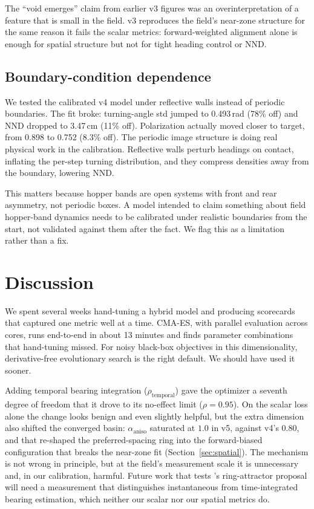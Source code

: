 \documentclass[11pt]{article}
\begin{document}
The ``void emerges'' claim from earlier v3 figures was an
overinterpretation of a feature that is small in the field. v3
reproduces the field's near-zone structure for the same reason it
fails the scalar metrics: forward-weighted alignment alone is enough
for spatial structure but not for tight heading control or NND.

\subsection{Boundary-condition dependence}

We tested the calibrated v4 model under reflective walls instead of
periodic boundaries. The fit broke: turning-angle std jumped to
0.493\,rad (78\% off) and NND dropped to 3.47\,cm (11\% off).
Polarization actually moved closer to target, from 0.898 to 0.752
(8.3\% off). The periodic image structure is doing real physical work
in the calibration. Reflective walls perturb headings on contact,
inflating the per-step turning distribution, and they compress
densities away from the boundary, lowering NND.

This matters because hopper bands are open systems with front and rear
asymmetry, not periodic boxes. A model intended to claim something
about field hopper-band dynamics needs to be calibrated under realistic
boundaries from the start, not validated against them after the fact.
We flag this as a limitation rather than a fix.

\section{Discussion}

We spent several weeks hand-tuning a hybrid model and producing scorecards
that captured one metric well at a time. CMA-ES, with parallel evaluation
across cores, runs end-to-end in about 13 minutes and finds parameter
combinations that hand-tuning missed. For noisy black-box objectives in
this dimensionality, derivative-free evolutionary search is the right
default. We should have used it sooner.

Adding temporal bearing integration ($\rho_\text{temporal}$) gave the
optimizer a seventh degree of freedom that it drove to its no-effect
limit ($\rho = 0.95$). On the scalar loss alone the change looks
benign and even slightly helpful, but the extra dimension also
shifted the converged basin: $\alpha_\text{aniso}$ saturated at $1.0$
in v5, against v4's $0.80$, and that re-shaped the preferred-spacing
ring into the forward-biased configuration that breaks the near-zone
fit (Section~\ref{sec:spatial}). The mechanism is not wrong in
principle, but at the field's measurement scale it is unnecessary and,
in our calibration, harmful. Future work that tests
\citet{sayin2025}'s ring-attractor proposal will need a measurement
that distinguishes instantaneous from time-integrated bearing
estimation, which neither our scalar nor our spatial metrics do.
\end{document}
